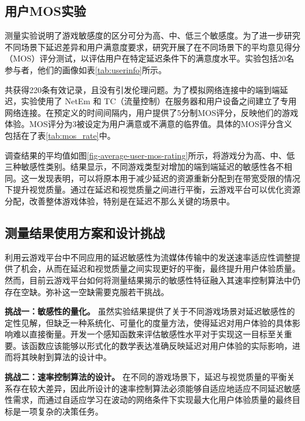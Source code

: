 \subsection{用户MOS实验}\label{sec-mos}

测量实验说明了游戏敏感度的区分可分为高、中、低三个敏感度。为了进一步研究不同场景下延迟差异和用户满意度要求，研究开展了在不同场景下的平均意见得分（MOS）评分测试，以评估用户在特定延迟条件下的满意度水平。实验包括20名参与者，他们的画像如表\ref{tab:userinfo}所示。



共获得220条有效记录，且没有引发伦理问题。为了模拟网络连接中的端到端延迟，实验使用了 NetEm 和 TC（流量控制）在服务器和用户设备之间建立了专用网络连接。在预定义的时间间隔内，用户提供了5分制MOS评分，反映他们的游戏体验。MOS评分为3被设定为用户满意或不满意的临界值。具体的MOS评分含义包括在了表\ref{tab:mos_rate}中。



调查结果的平均值如图\ref{fig-average-user-mos-rating}所示，将游戏分为高、中、低三种敏感性类别。结果显示，不同游戏类型对增加的端到端延迟的敏感性各不相同。这一发现表明，可以将原本用于减少延迟的资源重新分配到在带宽受限的情况下提升视觉质量。通过在延迟和视觉质量之间进行平衡，云游戏平台可以优化资源分配，改善整体游戏体验，特别是在延迟不那么关键的场景中。



\subsection{测量结果使用方案和设计挑战}
利用云游戏平台中不同应用的延迟敏感性为流媒体传输中的发送速率适应性调整提供了机会，从而在延迟和视觉质量之间实现更好的平衡，最终提升用户体验质量。然而，目前云游戏平台如何将测量结果揭示的敏感性特征融入其速率控制算法中仍存在空缺。弥补这一空缺需要克服若干挑战。

\textbf{挑战一：敏感性的量化。} 虽然实验结果提供了关于不同游戏场景对延迟敏感性的定性见解，但缺乏一种系统化、可量化的度量方法，使得延迟对用户体验的具体影响难以直接衡量。开发一个感知函数来评估敏感性水平对于实现这一目标至关重要。该函数应该能够以形式化的数学表达准确反映延迟对用户体验的实际影响，进而将其映射到算法的设计中。

\textbf{挑战二：速率控制算法的设计。} 在不同的游戏场景下，延迟与视觉质量的平衡关系存在较大差异，因此所设计的速率控制算法必须能够自适应地适应不同延迟敏感性需求，而通过自适应学习在波动的网络条件下实现最大化用户体验质量的最终目标是一项复杂的决策任务。

